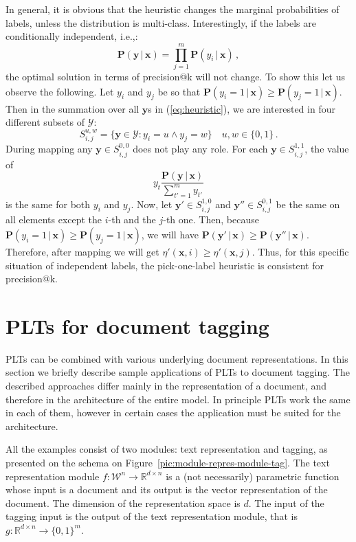 \documentclass{article}
\renewcommand{\vec}[1]{\boldsymbol{#1}}
\newcommand{\bx}{\vec{x}}
\newcommand{\by}{\vec{y}}
\newcommand{\calY}{\mathcal{Y}}
\newcommand{\calW}{\mathcal{W}}
\newcommand\R{\mathbb{R}}   %
\newcommand{\prob}{\mathbf{P}}
\newcommand{\given}{\, | \,}
\newcommand{\sectionBefore}{-0pt}
\newcommand{\sectionAfter}{-0pt}
\begin{document}
In general, it is obvious that the heuristic changes the marginal probabilities of labels, unless the distribution is multi-class. 
Interestingly, if the labels are conditionally independent, i.e.,:
$$
\prob(\by \given \bx) = \prod_{j=1}^m \prob(y_i \given \bx)\,,
$$
the optimal solution in terms of precision@k will not change. To show this let us observe the following.
Let $y_i$ and $y_j$ be so that $\prob(y_i = 1 \given \bx) \ge \prob(y_j = 1 \given \bx) $. Then in the summation over all $\by$s in (\ref{eq:heuristic}), we are interested in four different subsets of $\calY$: 
$$
S_{i,j}^{u,w}  =  \{\by\in \calY: y_i = u \land y_j = w\} \quad u,w \in \{0,1\} \,.
$$
During mapping any $\by \in S^{0,0}_{i,j}$ does not play any role. For each $\by \in S^{1,1}_{i,j}$, the value of 
$$
y_t \frac{\prob(\by \given \bx)}{\sum_{t'=1}^m y_{t'}}
$$ 
is the same for both $y_i$ and $y_j$. Now, let $\by' \in S^{1,0}_{i,j}$ and $\by'' \in S^{0,1}_{i,j}$ be the same on all elements except the $i$-th and the $j$-th one. Then, because   $\prob(y_i = 1 \given \bx) \ge \prob(y_j = 1 \given \bx) $, we will have $\prob(\by' \given \bx) \ge \prob(\by'' \given \bx)$. Therefore, after mapping we will get $\eta'(\bx,i) \ge \eta'(\bx, j)$. 
Thus, for this specific situation of independent labels, the pick-one-label heuristic is consistent for precision@k.

%
%
%




\vspace{\sectionBefore}
\section{PLTs for document tagging}
\label{sec:tagging_PLTs}
\vspace{\sectionAfter}


PLTs can be combined with various underlying document representations. In this section we briefly describe sample applications of PLTs to document tagging. 
The described approaches differ mainly in the representation of a document, and therefore in the architecture of the entire model. In principle PLTs work the same in each of them, however in certain cases the application must be suited for the architecture.

All the examples consist of two modules: text representation and tagging, as presented on the schema on Figure~\ref{pic:module-repres-module-tag}. The text representation module $f : \calW^{n} \rightarrow \R^{d \times n}$ is a (not necessarily) parametric function whose input is a document and its output is the vector representation of the document. The dimension of the representation space is $d$. 
The input of the tagging input is the output of the text representation module, that is $g: \R^{d \times n} \rightarrow  \{ 0 , 1 \}^m$. 
\end{document}
